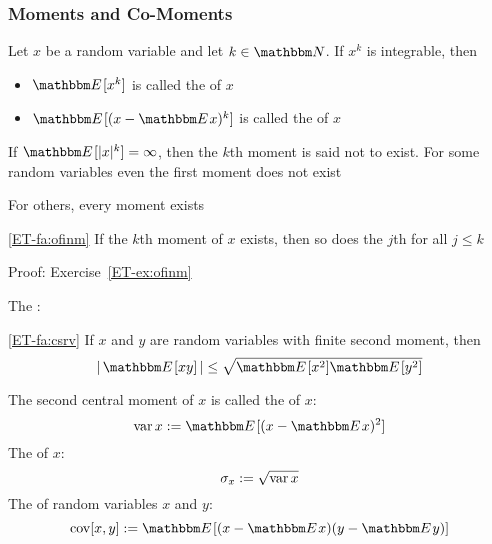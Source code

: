 \begin{frame}

    \frametitle{Moments and Co-Moments}
    
    \vspace{2em}
    
    Let $x$ be a random variable and let $k \in \NN$. If $x^k$ is integrable, then 
    \begin{itemize}
        \item $\EE [x^k] $ is called the  of $x$
        \item $\EE [ (x - \EE x)^k]$ is called the  of
            $x$
    \end{itemize}
    If $\EE [ |x|^k ] = \infty$, then the $k$th moment is said not to exist. 
    For
    some random variables even the first moment does not exist
    
    \vspace{.7em}
    For others, every
    moment exists
    
    \Fact\eqref{ET-fa:ofinm}
    If the $k$th moment of $x$ exists, then so does the $j$th for all $j \leq k$
    
    Proof: Exercise~\ref{ET-ex:ofinm}

\end{frame}

\begin{frame}

    \vspace{2em}
    The :

    \vspace{1em}
    \Fact\eqref{ET-fa:csrv}
        If $x$ and $y$ are random variables with finite second moment, then
        \begin{equation}
            \label{eq:csrv}
            \left| \, \EE [xy] \, \right| \leq \sqrt{ \EE[x^2] \EE[y^2] }
        \end{equation}
\end{frame}

\begin{frame}

    \vspace{2em}
    The second central moment of $x$ is called the  of $x$:
    \begin{equation*}
        \var x := \EE [ (x - \EE x)^2 ]
    \end{equation*}
    The  of $x$:
    \begin{equation*}
        \sigma_x := \sqrt{\operatorname{var} x}
    \end{equation*}
    The  of random variables $x$ and $y$:
    \begin{equation*}
        \cov[x, y] := \EE [ (x - \EE x)(y - \EE y) ]
    \end{equation*}
    
\end{frame}

